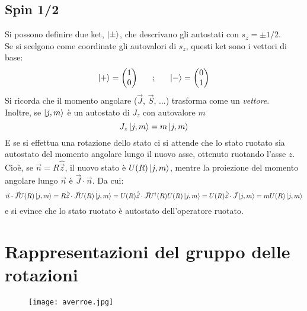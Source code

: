 \documentclass[twoside]{article}
\begin{document}
\vspace{0.5cm}
\subsection{Spin 1/2}
Si possono definire due ket, $\ket{\pm}$, che descrivano gli autostati con $s_z=\pm1/2$.
\\
Se si scelgono come coordinate gli autovalori di $s_z$, questi ket sono i vettori di base:
\begin{equation}
    \ket{+}=\begin{pmatrix}
    1 \\ 0
    \end{pmatrix} \ \ \ \ \ ; \ \ \ \ \ \ket{-}=\begin{pmatrix}
    0 \\ 1
    \end{pmatrix}
\end{equation}
Si ricorda che il momento angolare ($\Vec{J}$, $\Vec{S}$, ...) trasforma come un \textit{vettore}.
\\
Inoltre, se $\ket{j,m}$ è un autostato di $J_z$ con autovalore $m$
\begin{equation}
    J_z\ket{j,m}=m\ket{j,m}
\end{equation}
E se si effettua una rotazione dello stato ci si attende che lo stato ruotato sia autostato del momento angolare lungo il nuovo asse, ottenuto ruotando l'asse $z$.
\\
Cioè, se $\Vec{n}=R\hat{\Vec{z}}$, il nuovo stato è $U(R)\ket{j,m}$, mentre la proiezione del momento angolare lungo $\Vec{n}$ è $\Vec{J}\cdot \Vec{n}$. Da cui:
\begin{equation*}
    \Vec{n}\cdot \Vec{J}U(R)\ket{j,m}=R\hat{\Vec{z}}\cdot \Vec{J}U(R)\ket{j,m}=U(R)\hat{\Vec{z}}\cdot \Vec{J}U^{\dagger}(R)U(R)\ket{j,m}=U(R)\hat{\Vec{z}}\cdot \Vec{J}\ket{j,m}=mU(R)\ket{j,m}
\end{equation*}
e si evince che lo stato ruotato è autostato dell'operatore ruotato.













\newpage

\section{Rappresentazioni del gruppo delle rotazioni}
\begin{wrapfigure}[4]{L}{0.2\textwidth}
  \begin{center}
    \texttt{[image: averroe.jpg]}
  \end{center}
\end{wrapfigure}\leavevmode
\end{document}
